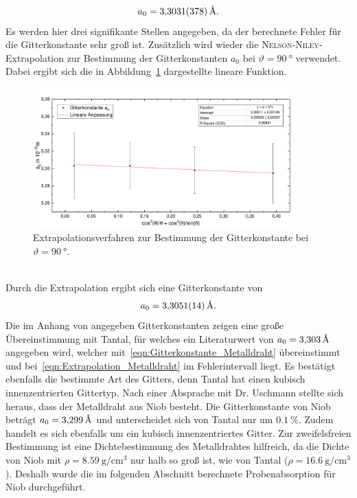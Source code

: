 \documentclass[a4paper,twoside,final]{article}
\begin{document}
\begin{align}
  a_0 = \SI{3,3031 \pm0,0378}{\textup{\AA}}.\label{eqn:Gitterkonstante_Metalldraht}
\end{align}
Es werden hier drei signifikante Stellen angegeben, da der berechnete Fehler für die Gitterkonstante sehr groß ist.
Zusätzlich wird wieder die \textsc{Nelson-Niley}-Extrapolation zur Bestimmung der Gitterkonstanten $a_0$ bei $\vartheta = \SI{90}{\degree}$ verwendet. Dabei ergibt sich die in Abbildung~\ref{fig:Extrapolation_Metalldraht} dargestellte lineare Funktion.
\begin{figure}[htp]
    \centering
        \includegraphics[width=0.9\textwidth]{Abbildungen/Extrapolation_Metalldraht.pdf}
    \caption{Extrapolationsverfahren zur Bestimmung der Gitterkonstante bei $\vartheta = \SI{90}{\degree}$.}
    \label{fig:Extrapolation_Metalldraht}
\end{figure}\\
Durch die Extrapolation ergibt sich eine Gitterkonstante von
\begin{align}
  a_0 =  \SI{3,3051 \pm 0,0014}{\textup{\AA}}.\label{eqn:Extrapolation_Metalldraht}
\end{align}
Die im Anhang von \cite{Uschmann} angegeben Gitterkonstanten zeigen eine große Übereinstimmung mit Tantal, für welches ein Literaturwert von $a_0 = \SI{3,303}{\textup{\AA}}$ angegeben wird, welcher mit~\eqref{eqn:Gitterkonstante_Metalldraht} übereinstimmt und bei~\eqref{eqn:Extrapolation_Metalldraht} im Fehlerintervall liegt. Es bestätigt ebenfalls die bestimmte Art des Gitters, denn Tantal hat einen kubisch innenzentrierten Gittertyp. Nach einer Absprache mit Dr. Uschmann stellte sich heraus, dass der Metalldraht aus Niob besteht. Die Gitterkonstante von Niob beträgt $a_0 = \SI{3,299}{\textup{\AA}}$ und unterscheidet sich von Tantal nur um $\SI{0,1}{\percent}$. Zudem handelt es sich ebenfalls um ein kubisch innenzentriertes Gitter. Zur zweifelsfreien Bestimmung ist eine Dichtebestimmung des Metalldrahtes hilfreich, da die Dichte von Niob mit $\rho = \SI{8,59}{\gram\per\centi\metre\cubed}$ nur halb so groß ist, wie von Tantal ($\rho = \SI{16,6}{\gram\per\centi\metre\cubed}$). Deshalb wurde die im folgenden Abschnitt berechnete Probenabsorption für Niob durchgeführt.
\end{document}
